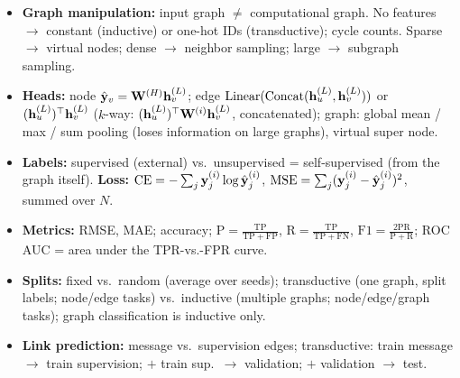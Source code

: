 \bigskip{}
{}
\begin{summarybox}
  \begin{itemize}
    \item \textbf{Graph manipulation:} input graph $\neq$ computational graph.
      No features $\to$ constant (inductive) or one-hot IDs (transductive);
      cycle counts. Sparse $\to$ virtual nodes; dense $\to$ neighbor sampling;
      large $\to$ subgraph sampling.
    \item \textbf{Heads:} node $\hat{\mathbf{y}}_v=\mathbf{W}^{(H)}\mathbf{h}_v^{(L)}$; edge
      $\mathrm{Linear}(\mathrm{Concat}(\mathbf{h}_u^{(L)},\mathbf{h}_v^{(L)}))$ or
      $(\mathbf{h}_u^{(L)})^{\top}\mathbf{h}_v^{(L)}$ ($k$-way: $(\mathbf{h}_u^{(L)})^{\top}\mathbf{W}^{(i)}\mathbf{h}_v^{(L)}$,
      concatenated); graph: global mean / max / sum pooling (loses information
      on large graphs), virtual super node.
    \item \textbf{Labels:} supervised (external) vs.\ unsupervised =
      self-supervised (from the graph itself). \textbf{Loss:}
      $\mathrm{CE}=-\sum_j\mathbf{y}_j^{(i)}\log\hat{\mathbf{y}}_j^{(i)}$,
      $\mathrm{MSE}=\sum_j(\mathbf{y}_j^{(i)}-\hat{\mathbf{y}}_j^{(i)})^2$, summed over $N$.
    \item \textbf{Metrics:} RMSE, MAE; accuracy; $\mathrm{P}=\frac{\mathrm{TP}}{\mathrm{TP}+\mathrm{FP}}$,
      $\mathrm{R}=\frac{\mathrm{TP}}{\mathrm{TP}+\mathrm{FN}}$,
      $\mathrm{F1}=\frac{2\mathrm{P}\mathrm{R}}{\mathrm{P}+\mathrm{R}}$; ROC
      AUC = area under the TPR-vs.-FPR curve.
    \item \textbf{Splits:} fixed vs.\ random (average over seeds); transductive
      (one graph, split labels; node/edge tasks) vs.\ inductive (multiple
      graphs; node/edge/graph tasks); graph classification is inductive only.
    \item \textbf{Link prediction:} message vs.\ supervision edges; transductive:
      train message $\to$ train supervision; $+$ train sup.\ $\to$ validation;
      $+$ validation $\to$ test.
  \end{itemize}
\end{summarybox}

